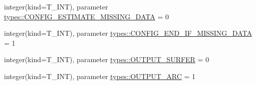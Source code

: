 \begin{DoxyCompactItemize}
\item 
integer(kind=T\_\-INT), parameter \hyperlink{namespacetypes_a160cf0789c7288f51ba40cb7e19f46a3}{types::CONFIG\_\-ESTIMATE\_\-MISSING\_\-DATA} = 0
\item 
integer(kind=T\_\-INT), parameter \hyperlink{namespacetypes_a9c39021370e43388bffb3def7c09570b}{types::CONFIG\_\-END\_\-IF\_\-MISSING\_\-DATA} = 1
\item 
integer(kind=T\_\-INT), parameter \hyperlink{namespacetypes_a6a4c289d08a585bfc0dda1fa41bf2b4a}{types::OUTPUT\_\-SURFER} = 0
\item 
integer(kind=T\_\-INT), parameter \hyperlink{namespacetypes_ad0c670d8c4ea7e20e1ae2bcdbb37ba24}{types::OUTPUT\_\-ARC} = 1
\end{DoxyCompactItemize}
